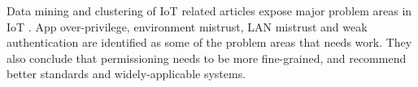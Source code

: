 Data mining and clustering of IoT related articles expose major problem areas in IoT \cite{zhang}. App over-privilege, environment mistrust, LAN mistrust and weak authentication are identified as some of the problem areas that needs work. They also conclude that permissioning needs to be more fine-grained, and recommend better standards and widely-applicable systems.